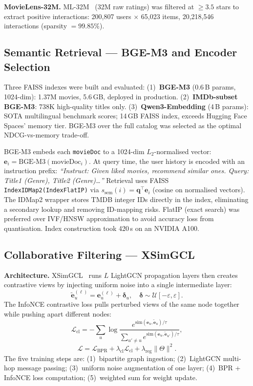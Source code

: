 \documentclass[conference]{IEEEtran}
\begin{document}
\textbf{MovieLens-32M.}
ML-32M~\cite{movielens} (32M raw ratings) was filtered at
$\geq3.5$ stars to extract positive interactions:
200,807 users $\times$ 65,023 items, 20,218,546 interactions
(sparsity $= 99.85\%$).

\subsection{Semantic Retrieval --- BGE-M3 and Encoder Selection}

Three FAISS indexes were built and evaluated:
(1)~\textbf{BGE-M3} (0.6\,B params, 1024-dim): 1.37M movies, 5.6\,GB,
deployed in production.
(2)~\textbf{IMDb-subset BGE-M3}: 738K high-quality titles only.
(3)~\textbf{Qwen3-Embedding} (4\,B params): SOTA multilingual benchmark
scores; 14\,GB FAISS index, exceeds Hugging Face Spaces' memory tier.
BGE-M3 over the full catalog was selected as the optimal
NDCG-vs-memory trade-off.

BGE-M3 embeds each \texttt{movieDoc} to a 1024-dim $L_2$-normalised
vector: $\mathbf{e}_i = \text{BGE-M3}(\text{movieDoc}_i)$.
At query time, the user history is encoded with an instruction prefix:
\emph{``Instruct: Given liked movies, recommend similar ones.
Query: Title1 (Genre), Title2 (Genre)\ldots''}
Retrieval uses FAISS \texttt{IndexIDMap2(IndexFlatIP)} via
$s_\text{sem}(i)=\mathbf{q}^\top\mathbf{e}_i$ (cosine on normalised vectors).
The IDMap2 wrapper stores TMDB integer IDs directly in the index,
eliminating a secondary lookup and removing ID-mapping risks.
FlatIP (exact search) was preferred over IVF/HNSW approximation
to avoid accuracy loss from quantisation.
Index construction took 420\,s on an NVIDIA A100.

\subsection{Collaborative Filtering --- XSimGCL}

\textbf{Architecture.}
XSimGCL~\cite{xsimgcl} runs $L$ LightGCN propagation layers then
creates contrastive views by injecting uniform noise into a single
intermediate layer:
\begin{equation}
  \tilde{\mathbf{e}}_u^{(\ell)} = \mathbf{e}_u^{(\ell)} + \boldsymbol\delta_u,
  \quad\boldsymbol\delta\sim\mathcal{U}[-\varepsilon,\varepsilon].
\end{equation}
The InfoNCE contrastive loss pulls perturbed views of the same node
together while pushing apart different nodes:
\begin{equation}
  \mathcal{L}_\text{cl} = -\!\sum_u \log
    \frac{e^{\mathrm{sim}(\mathbf{e}_u,\tilde{\mathbf{e}}_u)/\tau}}
         {\sum_{u'\neq u}e^{\mathrm{sim}(\mathbf{e}_u,\tilde{\mathbf{e}}_{u'})/\tau}},
\end{equation}
\begin{equation}
  \mathcal{L} = \mathcal{L}_\text{BPR} + \lambda_\text{cl}\mathcal{L}_\text{cl}
              + \lambda_\text{reg}\|\Theta\|^2.
\end{equation}
The five training steps are: (1)~bipartite graph ingestion;
(2)~LightGCN multi-hop message passing; (3)~uniform noise augmentation
of one layer; (4)~BPR + InfoNCE loss computation; (5)~weighted sum for
weight update.
\end{document}
